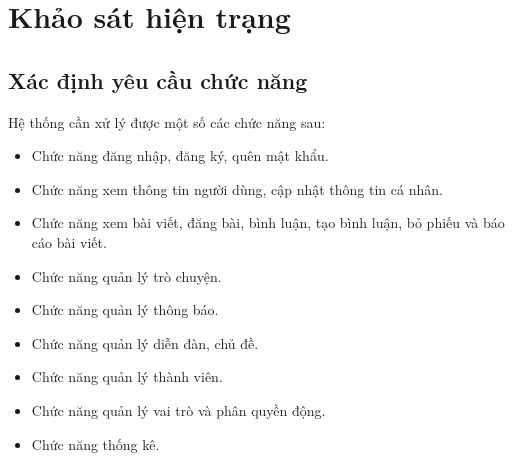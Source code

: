 \documentclass[../index.tex]{subfiles}
\begin{document}
    \section{Khảo sát hiện trạng}
    \subsection{Xác định yêu cầu chức năng}
    Hệ thống cần xử lý được một số các chức năng sau:
    \begin{itemize}
        \item Chức năng đăng nhập, đăng ký, quên mật khẩu.

        \item Chức năng xem thông tin người dùng, cập nhật thông tin cá nhân.

        \item Chức năng xem bài viết, đăng bài, bình luận, tạo bình luận, bỏ phiếu
            và báo cáo bài viết.

        \item Chức năng quản lý trò chuyện.

        \item Chức năng quản lý thông báo.

        \item Chức năng quản lý diễn đàn, chủ đề.

        \item Chức năng quản lý thành viên.

        \item Chức năng quản lý vai trò và phân quyền động.

        \item Chức năng thống kê.
    \end{itemize}
\end{document}
